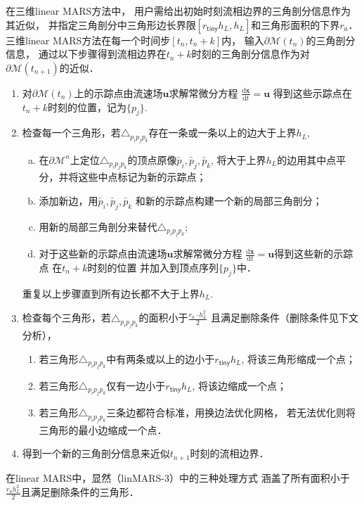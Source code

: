 \begin{defn}
	\label{defn:linMARS}
	在三维linear MARS方法中，
	用户需给出初始时刻流相边界的三角剖分信息作为其近似，
	并指定三角剖分中三角形边长界限$[r_\mathsf{tiny}h_L,h_L]$和三角形面积的下界$r_a$．
	三维linear MARS方法在每一个时间步$[t_n,t_n+k]$内，
	输入$\partial\mathcal{M}(t_n)$的三角剖分信息，
	通过以下步骤得到流相边界在$t_n+k$时刻的三角剖分信息作为对$\partial \mathcal{M}(t_{n+1})$的近似．

	\begin{enumerate}[{(linMARS}-1)]
		\setlength{\itemsep}{0pt}
		\setlength{\parsep}{0pt}
		\setlength{\parskip}{0pt}
		\item 对$\partial\mathcal{M}(t_n)$上的示踪点由流速场$\mathbf{u}$求解常微分方程
	           	     $\frac{\text{d}\mathbf{x}}{\text{d}t}=\mathbf{u}$
		             得到这些示踪点在$t_n+k$时刻的位置，记为$\{p_j\}$.
		\item 检查每一个三角形，若$\triangle_{p_i p_j p_k}$存在一条或一条以上的边大于上界$h_L$,　
		\begin{enumerate}[(a)]
			\item 在$\partial\mathcal{M}^n$上定位$\triangle_{p_i p_j p_k}$的顶点原像$\overleftarrow{p_i},
			            　\overleftarrow{p_j},　\overleftarrow{p_k}$, 将大于上界$h_L$的边用其中点平分，并将这些中点标记为新的示踪点；
			\item 添加新边，用$\overleftarrow{p_i},　\overleftarrow{p_j},　\overleftarrow{p_k}$
			             和新的示踪点构建一个新的局部三角剖分；
			\item 用新的局部三角剖分来替代$\triangle_{p_i p_j p_k}$;
			\item 对于这些新的示踪点由流速场$\mathbf{u}$求解常微分方程
			            $\frac{\text{d}\mathbf{x}}{\text{d}t}=\mathbf{u}$得到这些新的示踪点
			            在$t_n+k$时刻的位置
			            并加入到顶点序列$\{p_j\}$中．
		\end{enumerate}
		重复以上步骤直到所有边长都不大于上界$h_L$.
		\item 检查每个三角形，若$\triangle_{p_i p_j p_k}$的面积小于$\frac{r_a \cdot h_L^2}{2}$
		             且满足删除条件（删除条件见下文分析），
		\begin{enumerate}
			\item 若三角形$\triangle_{p_i p_j p_k}$中有两条或以上的边小于$r_{\mathsf{tiny}}h_L$,
			             将该三角形缩成一个点；
			\item 若三角形$\triangle_{p_i p_j p_k}$仅有一边小于$r_{\mathsf{tiny}}h_L$,
			             将该边缩成一个点；
			\item 若三角形$\triangle_{p_i p_j p_k}$三条边都符合标准，用换边法优化网格，
			             若无法优化则将三角形的最小边缩成一个点．
		\end{enumerate}
	\item 得到一个新的三角剖分信息来近似$t_{n+1}$时刻的流相边界．
	\end{enumerate}
\end{defn}
在linear MARS中，显然（linMARS-3）中的三种处理方式
涵盖了所有面积小于$\frac{r_ah_L^2}{2}$且满足删除条件的三角形．


